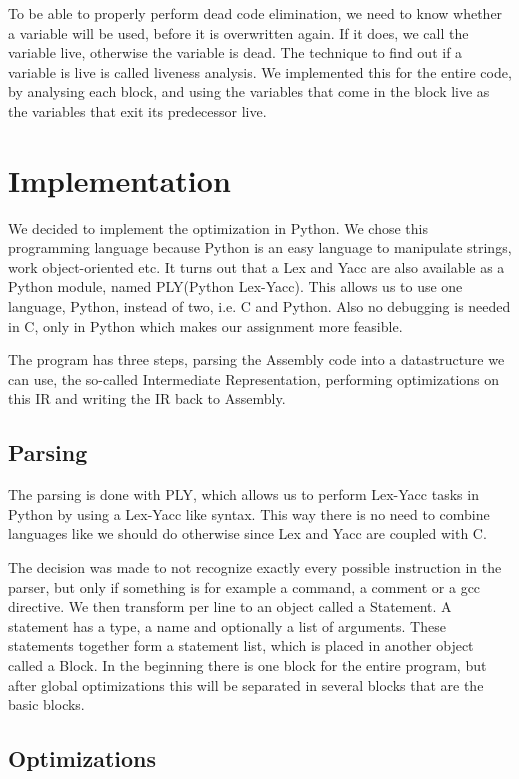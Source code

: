 \documentclass[10pt,a4paper]{article}
\begin{document}
To be able to properly perform dead code elimination, we need to know whether a
variable will be used, before it is overwritten again. If it does, we call the
variable live, otherwise the variable is dead. The technique to find out if a
variable is live is called liveness analysis. We implemented this for the
entire code, by analysing each block, and using the variables that come in the
block live as the variables that exit its predecessor live.

\section{Implementation}

We decided to implement the optimization in Python. We chose this programming
language because Python is an easy language to manipulate strings, work
object-oriented etc.
It turns out that a Lex and Yacc are also available as a Python module,
named PLY(Python Lex-Yacc). This allows us to use one language, Python, instead
of two, i.e. C and Python. Also no debugging is needed in C, only in Python
which makes our assignment more feasible.

The program has three steps, parsing the Assembly code into a datastructure we
can use, the so-called Intermediate Representation, performing optimizations on
this IR and writing the IR back to Assembly.

\subsection{Parsing}

The parsing is done with PLY, which allows us to perform Lex-Yacc tasks in
Python by using a Lex-Yacc like syntax. This way there is no need to combine
languages like we should do otherwise since Lex and Yacc are coupled with C.

The decision was made to not recognize exactly every possible instruction in
the parser, but only if something is for example a command, a comment or a gcc
directive. We then transform per line to an object called a Statement. A
statement has a type, a name and optionally a list of arguments. These
statements together form a statement list, which is placed in another object
called a Block. In the beginning there is one block for the entire program, but
after global optimizations this will be separated in several blocks that are
the basic blocks.

\subsection{Optimizations}
\end{document}
